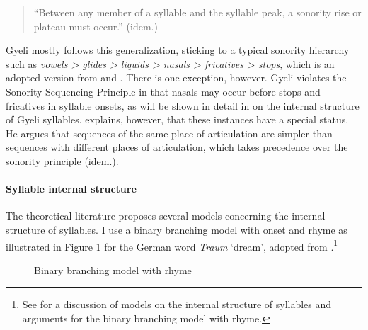 \begin{quote}
``Between any member of a syllable and the syllable peak, a sonority rise or plateau must occur.'' (idem.)
\end{quote}

Gyeli mostly follows this generalization, sticking to a typical sonority hierarchy such as {\itshape vowels > glides > liquids > nasals > fricatives > stops}, which is an adopted version from \citet{clements90} and \citet{blevins95}. There is one exception, however. Gyeli violates the Sonority Sequencing Principle in that nasals may occur before stops and fricatives in syllable onsets, as will be shown in detail in  on the internal structure of Gyeli syllables. \citet[321]{clements90} explains, however, that these instances have a special status.  He argues that sequences of the same place of articulation are simpler than sequences with different places of articulation, which takes precedence over the sonority principle (idem.).

\paragraph{Syllable internal structure} The theoretical literature proposes several models concerning the internal structure of syllables. I use a binary branching model with onset and rhyme as illustrated in Figure \ref{Fig:BranchModel} for the German word {\itshape Traum} `dream', adopted from \citet[213]{blevins95}.\footnote{See \citet[212-14]{blevins95} for a discussion of models on the internal structure of syllables and arguments for the binary branching model with rhyme.}

\begin{figure} 
\centering
{}
\caption{Binary branching model with rhyme}
\label{Fig:BranchModel}
\end{figure}

